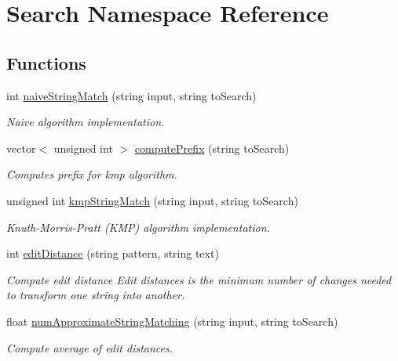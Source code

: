 \hypertarget{namespaceSearch}{}\section{Search Namespace Reference}
\label{namespaceSearch}
\subsection*{Functions}
\begin{DoxyCompactItemize}
\item 
int \hyperlink{namespaceSearch_aa55e8028834a8360d563bb8ad8ae8f3c}{naive\+String\+Match} (string input, string to\+Search)
\begin{DoxyCompactList}\small\item\em Naive algorithm implementation. \end{DoxyCompactList}\item 
vector$<$ unsigned int $>$ \hyperlink{namespaceSearch_a8ff541141f8795df51d47f0ecb546191}{compute\+Prefix} (string to\+Search)
\begin{DoxyCompactList}\small\item\em Computes prefix for kmp algorithm. \end{DoxyCompactList}\item 
unsigned int \hyperlink{namespaceSearch_aeb44ffcdb7fd6b1c61a36ad2f9af5f5a}{kmp\+String\+Match} (string input, string to\+Search)
\begin{DoxyCompactList}\small\item\em Knuth-\/\+Morris-\/\+Pratt (K\+MP) algorithm implementation. \end{DoxyCompactList}\item 
int \hyperlink{namespaceSearch_aaf0d5bd8cdbf3105049d269d1d3b3482}{edit\+Distance} (string pattern, string text)
\begin{DoxyCompactList}\small\item\em Compute edit distance Edit distances is the minimum number of changes needed to transform one string into another. \end{DoxyCompactList}\item 
float \hyperlink{namespaceSearch_abc5fac4445a114b88b5812a045c587a9}{num\+Approximate\+String\+Matching} (string input, string to\+Search)
\begin{DoxyCompactList}\small\item\em Compute average of edit distances. \end{DoxyCompactList}\item 

\end{DoxyCompactItemize}
